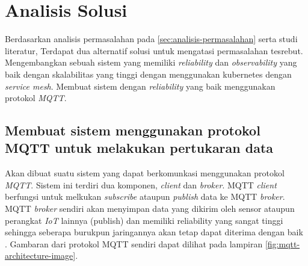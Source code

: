 \section{Analisis Solusi}

Berdasarkan analisis permasalahan pada \ref{sec:analisis-permasalahan} serta studi literatur, Terdapat dua alternatif solusi untuk mengatasi permasalahan tesrebut.
Mengembangkan sebuah sistem yang memiliki \textit{reliability} dan \textit{observability} yang baik dengan skalabilitas yang tinggi dengan menggunakan kubernetes dengan \textit{service mesh}. Membuat sistem dengan \textit{reliability} yang baik menggunakan protokol \textit{MQTT}.




\subsection{Membuat sistem menggunakan protokol MQTT untuk melakukan pertukaran data}
Akan dibuat suatu sistem yang dapat berkomunkasi menggunakan protokol \textit{MQTT}. Sistem ini terdiri dua komponen, \textit{client} dan \textit{broker}. MQTT \textit{client} berfungsi untuk melkukan \textit{subscribe} ataupun \textit{publish} data ke MQTT \textit{broker}. MQTT \textit{broker} sendiri akan menyimpan data yang dikirim oleh sensor ataupun perangkat \textit{IoT} lainnya (publish) dan memiliki reliability yang sangat tinggi sehingga seberapa burukpun jaringannya akan tetap dapat diterima dengan baik \parencite{mqtt}. Gambaran dari protokol MQTT sendiri dapat dilihat pada lampiran \ref{fig:mqtt-architecture-image}.

